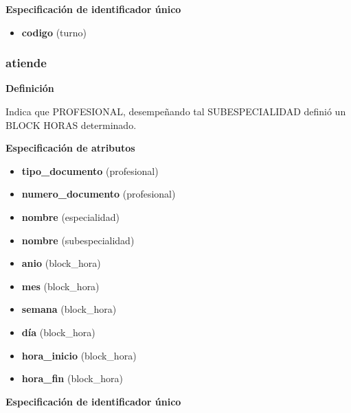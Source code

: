 \documentclass[a4paper,11pt]{article}
\begin{document}
\textbf{Especificación de identificador único}

\begin{itemize}

     \item \textbf{codigo} (turno)


\end{itemize}

\subsubsection{\textbf{atiende}}

\textbf{Definición}

Indica que PROFESIONAL, desempeñando tal SUBESPECIALIDAD definió un BLOCK 
HORAS determinado.

\textbf{Especificación de atributos}


\begin{itemize}
		\item \textbf{tipo\_documento} (profesional)

		\item \textbf{numero\_documento} (profesional)

		\item \textbf{nombre} (especialidad)

		\item \textbf{nombre} (subespecialidad)

		\item \textbf{anio} (block\_hora)

		\item \textbf{mes} (block\_hora)

		\item \textbf{semana} (block\_hora)

		\item \textbf{día} (block\_hora)

		\item \textbf{hora\_inicio} (block\_hora)

		\item \textbf{hora\_fin} (block\_hora)


\end{itemize}

\textbf{Especificación de identificador único}
\end{document}
